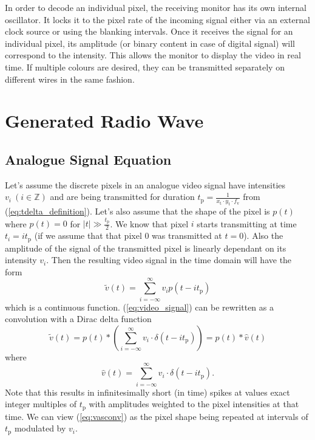 \documentclass[a4paper,12pt,twoside,openright]{report}
\begin{document}
In order to decode an individual pixel, the receiving monitor has its own internal oscillator. It locks it to the pixel rate of the incoming signal either via an external clock source or using the blanking intervals. Once it receives the signal for an individual pixel, its amplitude (or binary content in case of digital signal) will correspond to the intensity. This allows the monitor to display the video in real time. If multiple colours are desired, they can be transmitted separately on different wires in the same fashion.

\section{Generated Radio Wave}

\subsection{Analogue Signal Equation}
Let's assume the discrete pixels in an analogue video signal have intensities $v_{i}\ (i \in \mathbb{Z})$ and are being transmitted for duration $t_\text{p}=\frac{1}{x_\text{t} \cdot y_\text{t} \cdot f_\text{v}}$ from (\ref{eq:tdelta_definition}). Let's also assume that the shape of the pixel is $p(t)$ where $p(t)=0$ for $|t| \gg \frac{t_\text{p}}{2}$. We know that pixel $i$ starts transmitting at time $t_{i}=i t_\text{p}$ (if we assume that that pixel 0 was transmitted at $t=0$). Also the amplitude of the signal of the transmitted pixel is linearly dependant on its intensity $v_{i}$. Then the resulting video signal in the time domain will have the form 
\begin{equation}
\label{eq:video_signal}
\tilde{v}(t) = \sum\limits_{i=-\infty}^{\infty} v_{i} p(t-i t_\text{p})
\end{equation}
which is a continuous function. (\ref{eq:video_signal}) can be rewritten as a convolution with a Dirac delta function
\begin{equation}
\label{eq:vasconv}
\tilde{v}(t) = p(t) \ast \left( \sum\limits_{i=-\infty}^{\infty} v_{i} \cdot \delta(t-i t_\text{p}) \right) = p(t) \ast \hat{v}(t)
\end{equation}
where
\begin{equation}
\label{eq:vhattdef}
\hat{v}(t) = \sum\limits_{i=-\infty}^{\infty} v_{i} \cdot \delta(t-i t_\text{p}) .
\end{equation}
Note that this results in infinitesimally short (in time) spikes at values exact integer multiples of $t_\text{p}$ with amplitudes weighted to the pixel intensities at that time. We can view (\ref{eq:vasconv}) as the pixel shape being repeated at intervals of $t_\text{p}$ modulated by $v_{i}$. 
\end{document}
